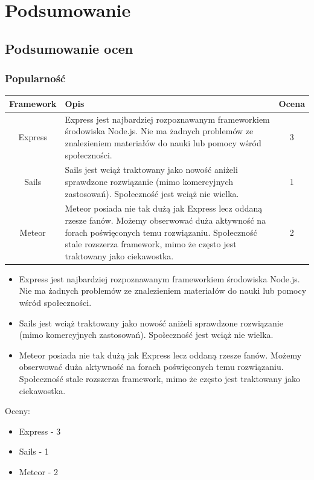 \documentclass[12pt]{report}
\begin{document}
\chapter{Podsumowanie}
  \section{Podsumowanie ocen}
    \subsection{Popularność}
      \smallskip
        \begin{center}
          \begin{tabular}{ | c | l | c | }
            \hline
            Framework & Opis & Ocena \\
            \hline
            Express & Express jest najbardziej rozpoznawanym frameworkiem środowiska Node.js. Nie ma żadnych problemów ze znalezieniem materiałów do nauki lub pomocy wśród społeczności. & 3 \\
            \hline
            Sails & Sails jest wciąż traktowany jako nowość aniżeli sprawdzone rozwiązanie (mimo komercyjnych zastosowań). Społeczność jest wciąż nie wielka. & 1\\
            \hline
            Meteor & Meteor posiada nie tak dużą jak Express lecz oddaną rzesze fanów. Możemy obserwować duża aktywność na forach poświęconych temu rozwiązaniu. Społeczność stale rozszerza framework, mimo że często jest traktowany jako ciekawostka. & 2 \\
            \hline
          \end{tabular}
        \end{center}
      \bigskip\medskip


      \begin{itemize}
        \item Express jest najbardziej rozpoznawanym frameworkiem środowiska Node.js. Nie ma żadnych problemów ze znalezieniem materiałów do nauki lub pomocy wśród społeczności.
        \item Sails jest wciąż traktowany jako nowość aniżeli sprawdzone rozwiązanie (mimo komercyjnych zastosowań). Społeczność jest wciąż nie wielka.
        \item Meteor posiada nie tak dużą jak Express lecz oddaną rzesze fanów. Możemy obserwować duża aktywność na forach poświęconych temu rozwiązaniu. Społeczność stale rozszerza framework, mimo że często jest traktowany jako ciekawostka. 
      \end{itemize}
      Oceny:
      \begin{itemize}
        \item Express - 3
        \item Sails - 1
        \item Meteor - 2
      \end{itemize}
\end{document}
